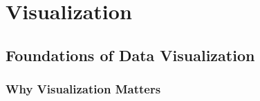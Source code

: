 \chapter{Visualization}

\section{Foundations of Data Visualization}

\subsection{Why Visualization Matters}

